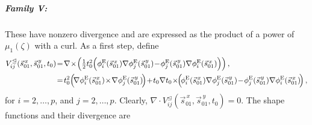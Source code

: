 \subparagraph{Family V:}
These have nonzero divergence and are expressed as the product of a power of $\mu_1(\zeta)$ with a curl. 
As a first step, define
\begin{equation}
\begin{aligned}
		V_{ij}^\trianglelefteq(\vec{s}_{01}^{\,x},\vec{s}_{01}^{\,y},t_0)&\!=\!\nabla\!\times\!\Big(\textstyle{\frac{1}{2}}t_0^2
			\Big(\phi_i^\E(\vec{s}_{01}^{\,x})\nabla\phi_j^\E(\vec{s}_{01}^{\,y})
					\!-\!\phi_j^\E(\vec{s}_{01}^{\,y})\nabla\phi_i^\E(\vec{s}_{01}^{\,x})\Big)\Big)\,,\\
			&\!=\!t_0^2\Big(\!\nabla\phi_i^\E(\vec{s}_{01}^{\,x})\!\times\!\nabla\phi_j^\E(\vec{s}_{01}^{\,y})\!\Big)
				\!+\!t_0\nabla t_0\!\times\!\!\Big(\!\phi_i^\E(\vec{s}_{01}^{\,x})\nabla\phi_j^\E(\vec{s}_{01}^{\,y})
					\!-\!\phi_j^\E(\vec{s}_{01}^{\,y})\nabla\phi_i^\E(\vec{s}_{01}^{\,x})\!\Big)\,,
	\end{aligned}
	\label{eq:PyrHdivBubblesAuxI}
\end{equation}
for $i=2,\ldots,p$, and $j=2,\ldots,p$.
Clearly, $\nabla\cdot V_{ij}^\trianglelefteq(\vec{s}_{01}^{\,x},\vec{s}_{01}^{\,y},t_0)=0$.
The shape functions and their divergence are
